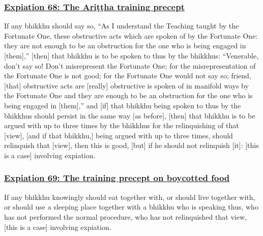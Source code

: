 \subsubsection*{\hyperref[pac68]{Expiation 68: The Ariṭṭha training precept}}
\label{exp68}
If any bhikkhu should say so, ``As I understand the Teaching taught by the Fortunate One, these obstructive acts which are spoken of by the Fortunate One: they are not enough to be an obstruction for the one who is being engaged in [them],'' [then] that bhikkhu is to be spoken to thus by the bhikkhus: ``Venerable, don't say so! Don't misrepresent the Fortunate One; for the misrepresentation of the Fortunate One is not good; for the Fortunate One would not say so; friend, [that] obstructive acts are [really] obstructive is spoken of in manifold ways by the Fortunate One and they are enough to be an obstruction for the one who is being engaged in [them],'' and [if] that bhikkhu being spoken to thus by the bhikkhus should persist in the same way [as before], [then] that bhikkhu is to be argued with up to three times by the bhikkhus for the relinquishing of that [view], [and if that bhikkhu,] being argued with up to three times, should relinquish that [view], then this is good, [but] if he should not relinquish [it]: [this is a case] involving expiation.

\subsubsection*{\hyperref[pac69]{Expiation 69: The training precept on boycotted food}}
\label{exp69}
If any bhikkhu knowingly should eat together with, or should live together with, or should use a sleeping place together with a bhikkhu who is speaking thus, who has not performed the normal procedure, who has not relinquished that view, [this is a case] involving expiation.

